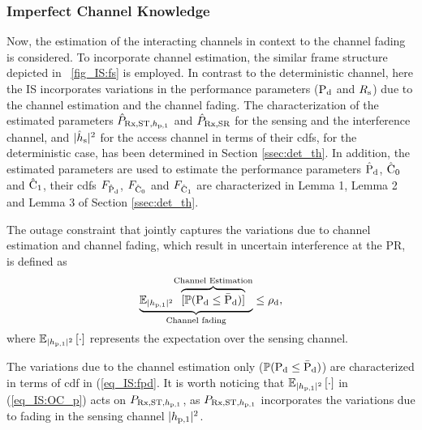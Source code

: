 \subsubsection{Imperfect Channel Knowledge} \label{ssec:ice}
Now, the estimation of the interacting channels in context to the channel fading is considered. To incorporate channel estimation, the similar frame structure depicted in \figurename~\ref{fig_IS:fs} is employed. In contrast to the deterministic channel, here the IS incorporates variations in the performance parameters ($\text{P}_{\text{d}}$ and $R_{\text{s}}$) due to the channel estimation and the channel fading. 
The characterization of the estimated parameters $\hat{P}_{\text{Rx,ST,$h_{\text{p,1}}$}}$ and $\hat{P}_{\text{Rx,SR}}$ for the sensing and the interference channel, and $|\hat{h}_{\text{s}}|^2$ for the access channel in terms of their cdfs, for the deterministic case, has been determined in Section \ref{ssec:det_th}. In addition, the estimated parameters are used to estimate the performance parameters $\hat{\text{P}}_{\text{d}}$, $\hat{\text{C}}_{\text{0}}$ and $\hat{\text{C}}_{\text{1}}$, their cdfs $F_{\hat{\text{P}}_{\text{d}}}$, $F_{\hat{\text{C}}_{\text{0}}}$ and $F_{\hat{\text{C}}_{\text{1}}}$ are characterized in Lemma 1, Lemma 2 and Lemma 3 of Section \ref{ssec:det_th}.

The outage constraint that jointly captures the variations due to channel estimation and channel fading, which result in uncertain interference at the PR, is defined as 
\begin{align}
\smash[b]{\underbrace{\mathbb{E}_{|h_{\text{p,1}}|^2}{\smash[b]{\overbrace{[\mathbb P( \text{P}_{\text{d}} \le \bar{\text{P}}_{\text{d}})]}^{\text{Channel Estimation}}}}}_{\text{Channel fading}}} &\le \rho_{\text{d}}, \label{eq_IS:OC_p} \\[-0.1em] \nonumber 
\end{align}
where ${\mathbb E}_{|h_{\text{p,1}}|^2}\left[ \cdot \right]$ represents the expectation over the sensing channel. 

The variations due to the channel estimation only ($\mathbb P(\text{P}_{\text{d}} \le \bar{\text{P}}_{\text{d}})$) are characterized in terms of cdf in (\ref{eq_IS:fpd}.
It is worth noticing that ${\mathbb E}_{|h_{\text{p,1}}|^2}\left[ \cdot \right]$ in (\ref{eq_IS:OC_p}) acts on $P_{\text{Rx,ST,$h_{\text{p,1}}$}}$, as $P_{\text{Rx,ST,$h_{\text{p,1}}$}}$ incorporates the variations due to fading in the sensing channel $|h_{\text{p,1}}|^2$.

